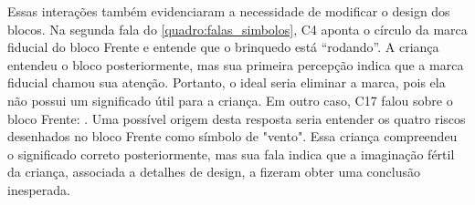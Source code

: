Essas interações também evidenciaram a necessidade de modificar o design dos blocos. Na segunda fala do \autoref{quadro:falas_simbolos}, C4 aponta o círculo da marca fiducial do bloco Frente e entende que o brinquedo está “rodando”. A criança entendeu o bloco posteriormente, mas sua primeira percepção indica que a marca fiducial chamou sua atenção. Portanto, o ideal seria eliminar a marca, pois ela não possui um significado útil para a criança. Em outro caso, C17 falou sobre o bloco Frente: . Uma possível origem desta resposta seria entender os quatro riscos desenhados no bloco Frente como símbolo de "vento". Essa criança compreendeu o significado correto posteriormente, mas sua fala indica que a imaginação fértil da criança, associada a detalhes de design, a fizeram obter uma conclusão inesperada.

